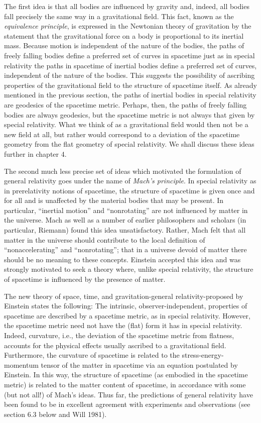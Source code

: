 The first idea is that all bodies are influenced by gravity and, indeed, all bodies fall precisely the same way in a gravitational field. This fact, known as the \emph{equivalence principle}, is expressed in the Newtonian theory of gravitation by the statement that the gravitational force on a body is proportional to its inertial mass. Because motion is independent of the nature of the bodies, the paths of freely falling bodies define a preferred set of curves in spacetime just as in special relativity the paths in spacetime of inertial bodies define a preferred set of curves, independent of the nature of the bodies. This suggests the possibility of ascribing properties of the gravitational field to the structure of spacetime itself. As already mentioned in the previous section, the paths of inertial bodies in special relativity are geodesics of the spacetime metric. Perhaps, then, the paths of freely falling bodies are always geodesics, but the spacetime metric is not always that given by special relativity. What we think of as a gravitational field would then not be a new field at all, but rather would correspond to a deviation of the spacetime geometry from the flat geometry of special relativity. We shall discuss these ideas further in chapter 4.

The second much less precise set of ideas which motivated the formulation of general relativity goes under the name of \emph{Mach's principle}. In special relativity as in prerelativity notions of spacetime, the structure of spacetime is given once and for all and is unaffected by the material bodies that may be present. In particular, ``inertial motion'' and ``nonrotating'' are not influenced by matter in the universe. Mach as well as a number of earlier philosophers and scholars (in particular, Riemann) found this idea unsatisfactory. Rather, Mach felt that all matter in the universe should contribute to the local definition of ``nonaccelerating'' and ``nonrotating''; that in a universe devoid of matter there should be no meaning to these concepts. Einstein accepted this idea and was strongly motivated to seek a theory where, unlike special relativity, the structure of spacetime is influenced by the presence of matter.

The new theory of space, time, and gravitation-general relativity-proposed by Einstein states the following: The intrinsic, observer-independent, properties of spacetime are described by a spacetime metric, as in special relativity. However, the spacetime metric need not have the (flat) form it has in special relativity. Indeed, curvature, i.e., the deviation of the spacetime metric from flatness, accounts for the physical effects usually ascribed to a gravitational field. Furthermore, the curvature of spacetime is related to the stress-energy-momentum tensor of the matter in spacetime via an equation postulated by Einstein. In this way, the structure of spacetime (as embodied in the spacetime metric) is related to the matter content of spacetime, in accordance with some (but not all!) of Mach's ideas. Thus far, the predictions of general relativity have been found to be in excellent agreement with experiments and observations (see section 6.3 below and Will 1981).

